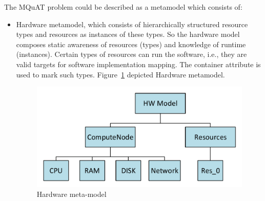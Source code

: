 The MQuAT problem could be described as a metamodel which consists of:
\begin{itemize}
	\item Hardware metamodel, which consists of hierarchically structured resource types and resources as instances of these types. So the hardware model composes static awareness of resources (types) and knowledge of runtime (instances). Certain types of resources can run the software, i.e., they are valid targets for software implementation mapping. The container attribute is used to mark such types. Figure~\ref{fig:HWmodel} depicted Hardware metamodel.
	\begin{figure}
		\centering
		\includegraphics[width=\textwidth]{images/HWModel}
		\caption[Hardware meta-model]{Hardware meta-model}
		\label{fig:HWmodel}
	\end{figure}


\end{itemize}
